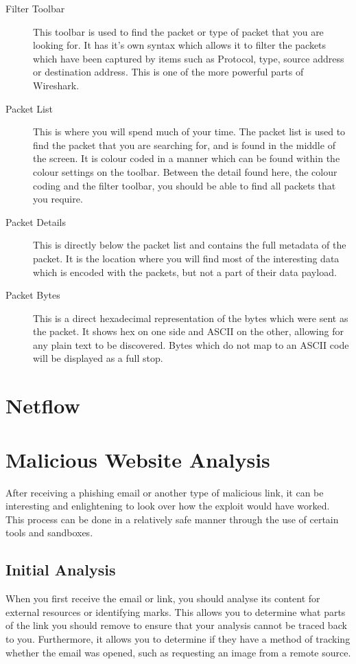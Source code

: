 			\begin{description}
				\item[Filter Toolbar] This toolbar is used to find the packet or type of packet that you are looking for. 
					It has it's own syntax which allows it to filter the packets which have been captured by items such as
					Protocol, type, source address or destination address. 
					This is one of the more powerful parts of Wireshark. 
				\item[Packet List] This is where you will spend much of your time. 
					The packet list is used to find the packet that you are searching for, and is found in the middle of the screen. 
					It is colour coded in a manner which can be found within the colour settings on the toolbar. 
					Between the detail found here, the colour coding and the filter toolbar, you should be able to find all packets that you require. 
				\item[Packet Details]
					This is directly below the packet list and contains the full metadata of the packet. 
					It is the location where you will find most of the interesting data which is encoded with the packets, but not a part of their data payload. 
				\item[Packet Bytes]
					This is a direct hexadecimal representation of the bytes which were sent as the packet. 
					It shows hex on one side and ASCII on the other, allowing for any plain text to be discovered. 
					Bytes which do not map to an ASCII code will be displayed as a full stop. 
			\end{description}
			
	\section{Netflow}
	\section{Malicious Website Analysis}
		After receiving a phishing email or another type of malicious link, it can be interesting and enlightening to look over how the exploit would have worked. 
		This process can be done in a relatively safe manner through the use of certain tools and sandboxes. 

		\subsection{Initial Analysis}
			When you first receive the email or link, you should analyse its content for external resources or identifying marks.
			This allows you to determine what parts of the link you should remove to ensure that your analysis cannot be traced back to you. 
			Furthermore, it allows you to determine if they have a method of tracking whether the email was opened, such as requesting an image from a remote source. 

